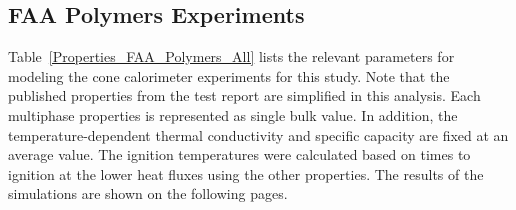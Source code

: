 \clearpage

\subsection{FAA Polymers Experiments}\label{sec_FAA_Polymers_Materials}

Table~\ref{Properties_FAA_Polymers_All} lists the relevant parameters for modeling the cone calorimeter experiments for this study.
Note that the published properties from the test report are simplified in this analysis. Each multiphase properties is represented as single bulk value. In addition, the temperature-dependent thermal conductivity and specific capacity are fixed at an average value.
The ignition temperatures were calculated based on times to ignition at the lower heat fluxes using the other properties.
The results of the simulations are shown on the following pages.

